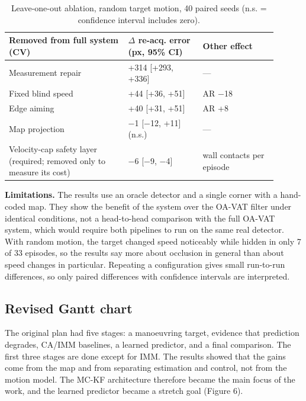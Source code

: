 \documentclass[12pt,a4paper]{article}
\begin{document}
\begin{table}[htbp]
  \centering
  \small
  \caption{Leave-one-out ablation, random target motion, 40 paired seeds (n.s. = confidence interval includes zero).}
  \renewcommand{\arraystretch}{1.15}
  \begin{tabular}{>{\raggedright\arraybackslash}p{0.40\linewidth}>{\raggedright\arraybackslash}p{0.25\linewidth}>{\raggedright\arraybackslash}p{0.25\linewidth}}
  \toprule
  \textbf{Removed from full system (CV)} & \textbf{$\Delta$ re-acq. error (px, 95\% CI)} & \textbf{Other effect} \\
  \midrule
  Measurement repair & +314 [+293, +336] & — \\
  Fixed blind speed & +44 [+36, +51] & AR $-$18 \\
  Edge aiming & +40 [+31, +51] & AR +8 \\
  Map projection & $-$1 [$-$12, +11] (n.s.) & — \\
  Velocity-cap safety layer (required; removed only to measure its cost) & $-$6 [$-$9, $-$4] & 59 wall contacts per episode \\
  \bottomrule
  \end{tabular}
\end{table}

\textbf{Limitations.} The results use an oracle detector and a single corner with a hand-coded map. They show the benefit of the system over the OA-VAT filter under identical conditions, not a head-to-head comparison with the full OA-VAT system, which would require both pipelines to run on the same real detector. With random motion, the target changed speed noticeably while hidden in only 7 of 33 episodes, so the results say more about occlusion in general than about speed changes in particular. Repeating a configuration gives small run-to-run differences, so only paired differences with confidence intervals are interpreted.

\subsection{Revised Gantt chart}
The original plan had five stages: a manoeuvring target, evidence that prediction degrades, CA/IMM baselines, a learned predictor, and a final comparison. The first three stages are done except for IMM. The results showed that the gains come from the map and from separating estimation and control, not from the motion model. The MC-KF architecture therefore became the main focus of the work, and the learned predictor became a stretch goal (Figure 6).
\end{document}
